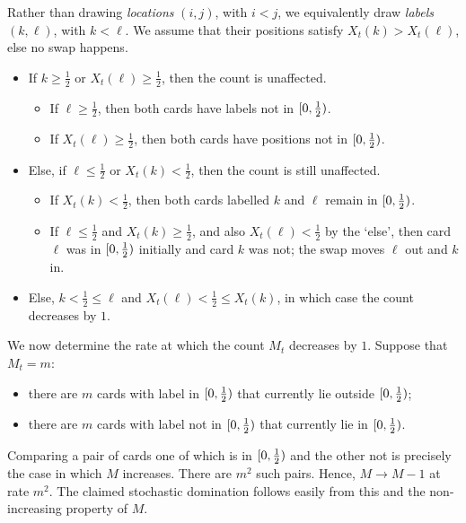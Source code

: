 \documentclass{article}
\begin{document}
\begin{Proof}%
Rather than drawing \emph{locations} $(i, j)$, with $i < j$, we equivalently draw \emph{labels} $(k, \ell)$, with $k < \ell$.
We assume that their positions satisfy $X_t(k) > X_t(\ell)$,
else no swap happens.
\begin{itemize}
	\item 
	If $k \ge \tfrac12$ or $X_t(\ell) \ge \tfrac12$,
	then the count is unaffected.
	\begin{itemize}
		\item 
		If $\ell \ge \tfrac12$,
		then both cards have labels not in $[0, \tfrac12)$.
		
		\item 
		If $X_t(\ell) \ge \tfrac12$,
		then both cards have positions not in $[0, \tfrac12)$.
	\end{itemize}
	
	\item 
	Else,
	if $\ell \le \tfrac12$ or $X_t(k) < \tfrac12$,
	then the count is still unaffected.
	\begin{itemize}
		\item 
		If $X_t(k) < \tfrac12$,
		then both cards labelled $k$ and $\ell$ remain in $[0, \tfrac12)$.
		
		\item 
		If $\ell \le \tfrac12$ and $X_t(k) \ge \tfrac12$,
		and also $X_t(\ell) < \tfrac12$ by the `else',
		then card $\ell$ was in $[0, \tfrac12)$ initially and card $k$ was not; the swap moves $\ell$ out and $k$ in.
	\end{itemize}
	
	\item 
	Else,
	$k < \tfrac12 \le \ell$ and $X_t(\ell) < \tfrac12 \le X_t(k)$, in which case the count decreases by $1$.
\end{itemize}

We now determine the rate at which the count $M_t$ decreases by $1$.
Suppose that $M_t = m$:
\begin{itemize}
	\item 
	there are $m$ cards with label in $[0, \tfrac12)$ that currently lie outside $[0, \tfrac12)$;
	
	\item 
	there are $m$ cards with label not in $[0, \tfrac12)$ that currently lie in $[0, \tfrac12)$.
\end{itemize}
Comparing a pair of cards one of which is in $[0, \tfrac12)$ and the other not is precisely the case in which $M$ increases.
There are $m^2$ such pairs.
Hence, $M \to M - 1$ at rate $m^2$.
The claimed stochastic domination follows easily from this and the non-increasing property of $M$.
\end{Proof}
\end{document}
